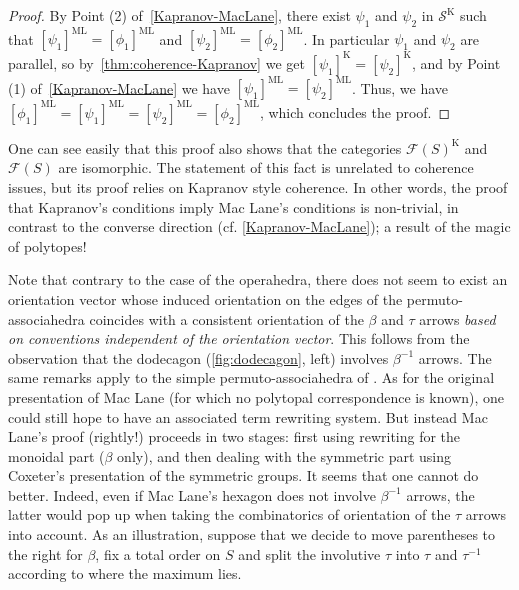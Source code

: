 {\begin{proof}
By Point (2) of~\cref{Kapranov-MacLane}, there exist $\psi_1$ and $\psi_2$ in $\mathcal{S}^{\mathrm{K}}$ such that $[\psi_1]^{\mathrm{ML}}=[\phi_1]^{\mathrm{ML}}$ and 
$[\psi_2]^{\mathrm{ML}}=[\phi_2]^{\mathrm{ML}}$.
In particular $\psi_1$ and $\psi_2$ are parallel, so by~\cref{thm:coherence-Kapranov} we get $[\psi_1]^{\mathrm{K}}=[\psi_2]^{\mathrm{K}}$, and by Point (1) of~\cref{Kapranov-MacLane} we have $[\psi_1]^{\mathrm{ML}}=[\psi_2]^{\mathrm{ML}}$.
Thus, we have $[\phi_1]^{\mathrm{ML}} = [\psi_1]^{\mathrm{ML}} =  [\psi_2]^{\mathrm{ML}} =  [\phi_2]^{\mathrm{ML}}$, which concludes the proof.
\end{proof}
\begin{rem} 
\label{rem:Kapranov-to-MacLane}
One can see easily that this proof  also shows that the categories  $\mathcal{F}(S)^{\mathrm{K}}$ and~$\mathcal{F}(S)$ are isomorphic.  
The statement of this fact is unrelated to coherence issues, but  its proof relies on Kapranov style coherence.
In other words, the  proof that Kapranov's conditions imply Mac Lane's conditions  is non-trivial, in contrast to the converse direction (cf. \cref{Kapranov-MacLane}); a result of the magic of polytopes!
\end{rem}
\begin{rem}
\label{MacLane-Kapranov-Simple}
Note that contrary to the case of the operahedra, there does not seem to exist an orientation vector whose induced orientation on the edges of the permuto-associahedra coincides with a consistent orientation of the $\beta$ and $\tau$ arrows \emph{based on conventions independent of the orientation vector}.
This follows from the observation that the dodecagon (\cref{fig:dodecagon}, left) involves $\beta^{-1}$ arrows.  
The same remarks apply to the simple permuto-associahedra of \cite{baralicSimplePermutoassociahedron2019}.
As for the original presentation of Mac Lane (for which no polytopal correspondence is known), one could still hope to have an associated  term rewriting system.  
But instead Mac Lane's proof (rightly!) proceeds in two stages: first using rewriting for the monoidal part ($\beta$ only), and then dealing with the symmetric part using Coxeter's presentation of the symmetric groups. 
It seems that one cannot do better. 
Indeed, even if  Mac Lane's hexagon does not involve $\beta^{-1}$  arrows, the latter would pop up when taking the combinatorics of orientation of the $\tau$ arrows into account. 
As an illustration, suppose that we decide to move parentheses to the right for $\beta$, fix a total order on $S$ and split the involutive $\tau$ into $\tau$ and $\tau^{-1}$ according to where the maximum lies. 

\end{rem}}
